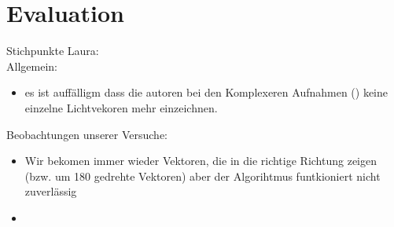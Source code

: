 \section{Evaluation}

Stichpunkte Laura:\\
Allgemein:\\
\begin{itemize}
\item es ist auffälligm dass die autoren bei den Komplexeren Aufnahmen () keine einzelne Lichtvekoren mehr einzeichnen. 
\end{itemize}

Beobachtungen unserer Versuche:\\
\begin{itemize}
\item Wir bekomen immer wieder Vektoren, die in die richtige Richtung zeigen  (bzw. um 180 gedrehte Vektoren) aber der Algorihtmus funtkioniert nicht zuverlässig
\item 
\end{itemize}





\newpage